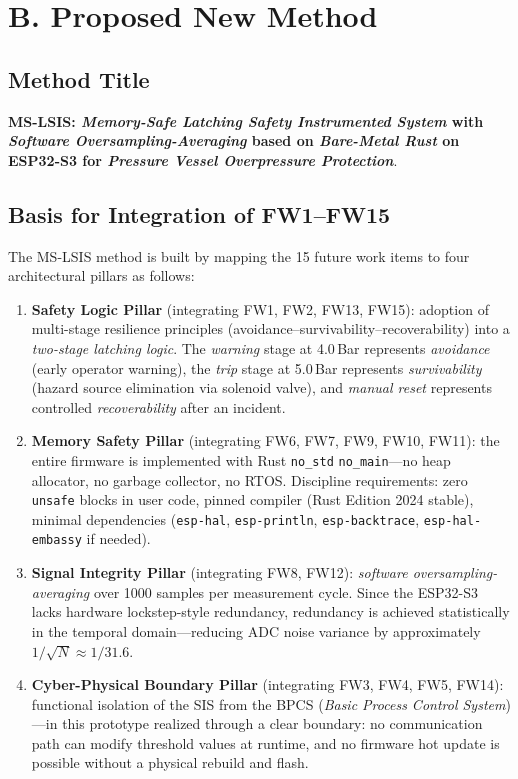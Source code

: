 \documentclass[11pt,a4paper]{article}
\begin{document}
\section{B. Proposed New Method}

\subsection*{Method Title}

\noindent\textbf{MS-LSIS: \textit{Memory-Safe Latching Safety Instrumented System} with \textit{Software Oversampling-Averaging} based on \textit{Bare-Metal Rust} on ESP32-S3 for \textit{Pressure Vessel Overpressure Protection}}.

\subsection*{Basis for Integration of FW1--FW15}

The MS-LSIS method is built by mapping the 15 future work items to four architectural pillars as follows:

\begin{enumerate}[leftmargin=2em,itemsep=2pt]
\item \textbf{Safety Logic Pillar} (integrating FW1, FW2, FW13, FW15): adoption of multi-stage resilience principles (avoidance--survivability--recoverability) into a \textit{two-stage latching logic}. The \textit{warning} stage at 4.0\,Bar represents \textit{avoidance} (early operator warning), the \textit{trip} stage at 5.0\,Bar represents \textit{survivability} (hazard source elimination via solenoid valve), and \textit{manual reset} represents controlled \textit{recoverability} after an incident.
\item \textbf{Memory Safety Pillar} (integrating FW6, FW7, FW9, FW10, FW11): the entire firmware is implemented with Rust \texttt{no\_std} \texttt{no\_main}---no heap allocator, no garbage collector, no RTOS. Discipline requirements: zero \texttt{unsafe} blocks in user code, pinned compiler (Rust Edition 2024 stable), minimal dependencies (\texttt{esp-hal}, \texttt{esp-println}, \texttt{esp-backtrace}, \texttt{esp-hal-embassy} if needed).
\item \textbf{Signal Integrity Pillar} (integrating FW8, FW12): \textit{software oversampling-averaging} over 1000 samples per measurement cycle. Since the ESP32-S3 lacks hardware lockstep-style redundancy, redundancy is achieved statistically in the temporal domain---reducing ADC noise variance by approximately $1/\sqrt{N} \approx 1/31.6$.
\item \textbf{Cyber-Physical Boundary Pillar} (integrating FW3, FW4, FW5, FW14): functional isolation of the SIS from the BPCS (\textit{Basic Process Control System})---in this prototype realized through a clear boundary: no communication path can modify threshold values at runtime, and no firmware hot update is possible without a physical rebuild and flash.
\end{enumerate}
\end{document}
